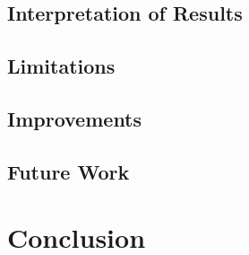 \documentclass[12pt,a4paper]{report}
\begin{document}
\section{Interpretation of Results}


\section{Limitations}


\section{Improvements}



\section{Future Work}








\chapter{Conclusion}
\label{ch:conclusion}

\end{document}
